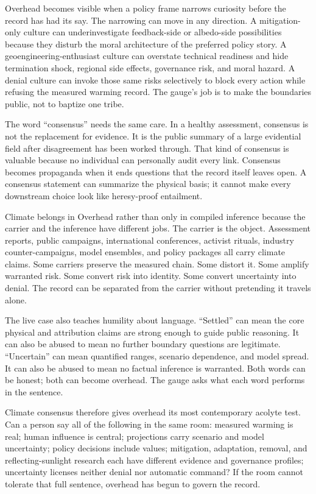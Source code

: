 Overhead becomes visible when a policy frame narrows curiosity before
the record has had its say. The narrowing can move in any direction. A
mitigation-only culture can underinvestigate feedback-side or
albedo-side possibilities because they disturb the moral architecture
of the preferred policy story. A geoengineering-enthusiast culture can
overstate technical readiness and hide termination shock, regional side
effects, governance risk, and moral hazard. A denial culture can invoke
those same risks selectively to block every action while refusing the
measured warming record. The gauge's job is to make the boundaries
public, not to baptize one tribe.

The word ``consensus'' needs the same care. In a healthy assessment,
consensus is not the replacement for evidence. It is the public summary
of a large evidential field after disagreement has been worked through.
That kind of consensus is valuable because no individual can personally
audit every link. Consensus becomes propaganda when it ends questions
that the record itself leaves open. A consensus statement can summarize
the physical basis; it cannot make every downstream choice look like
heresy-proof entailment.

Climate belongs in Overhead rather than only in compiled inference
because the carrier and the inference have different jobs. The carrier
is the object. Assessment reports, public campaigns,
international conferences, activist rituals, industry counter-campaigns,
model ensembles, and policy packages all carry climate claims. Some
carriers preserve the measured chain. Some distort it. Some amplify
warranted risk. Some convert risk into identity. Some convert
uncertainty into denial. The record can be separated from the carrier
without pretending it travels alone.

The live case also teaches humility about language. ``Settled'' can
mean the core physical and attribution claims are strong enough to
guide public reasoning. It can also be abused to mean no further
boundary questions are legitimate. ``Uncertain'' can mean quantified
ranges, scenario dependence, and model spread. It can also be abused to
mean no factual inference is warranted. Both words can be honest; both
can become overhead. The gauge asks what each word performs in the
sentence.

Climate consensus therefore gives overhead its most contemporary
acolyte test. Can a person say all of the following in the same room:
measured warming is real; human influence is central; projections carry
scenario and model uncertainty; policy decisions include values;
mitigation, adaptation, removal, and reflecting-sunlight research each
have different evidence and governance profiles; uncertainty licenses
neither denial nor automatic command? If the room cannot tolerate that
full sentence, overhead has begun to govern the record.

